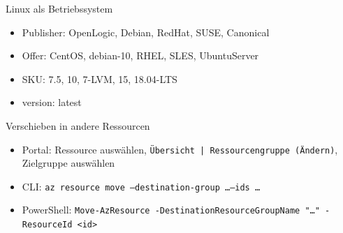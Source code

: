 \begin{flashcard}[Definition]{Linux als Betriebssystem}
    \begin{itemize}
        \item Publisher: OpenLogic, Debian, RedHat, SUSE, Canonical
        \item Offer: CentOS, debian-10, RHEL, SLES, UbuntuServer
        \item SKU: 7.5, 10, 7-LVM, 15, 18.04-LTS
        \item version: latest
    \end{itemize}
\end{flashcard}

\begin{flashcard}[Definition]{Verschieben in andere Ressourcen}
    \begin{itemize}
        \item Portal:\newline
            Ressource auswählen, \texttt{Übersicht | Ressourcengruppe (Ändern)}, Zielgruppe auswählen
        \item CLI:\newline
            \texttt{az resource move --destination-group \ldots --ids \ldots}
        \item PowerShell:\newline
            \texttt{Move-AzResource\ -DestinationResourceGroupName "\ldots"\ -ResourceId <id>}
    \end{itemize}

\end{flashcard}
